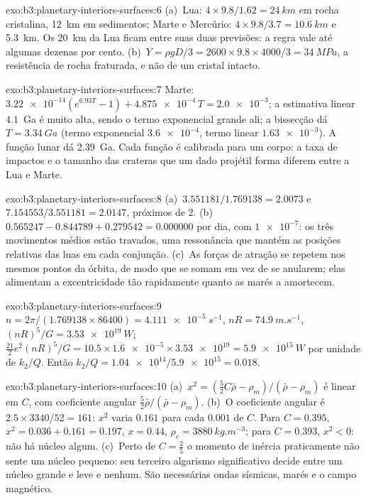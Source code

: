\begin{solution}{exo:b3:planetary-interiors-surfaces:6}
(a)~Lua: $4\times9.8/1.62 = \qty{24}{km}$ em rocha cristalina,
\qty{12}{km} em sedimentos; Marte e Mercúrio: $4\times9.8/3.7 =
\qty{10.6}{km}$ e \qty{5.3}{km}. Os \qty{20}{km} da Lua ficam entre
suas duas previsões: a regra vale até algumas dezenas por cento. (b)~$Y =
\rho gD/3 = 2600\times9.8\times4000/3 = \qty{34}{MPa}$, a resistência de
rocha fraturada, e não de um cristal intacto.
\end{solution}

\begin{solution}{exo:b3:planetary-interiors-surfaces:7}
Marte: $\num{3.22e-14}(e^{6.93T} - 1) + \num{4.875e-4}\,T = \num{2.0e-3}$;
a estimativa linear $4.1$~Ga é muito alta, sendo o termo exponencial grande
ali; a bissecção dá $T = \qty{3.34}{Ga}$ (termo exponencial
$\num{3.6e-4}$, termo linear $\num{1.63e-3}$). A função lunar dá
\qty{2.39}{Ga}. Cada função é calibrada para um corpo: a taxa de
impactos e o tamanho das crateras que um dado projétil forma diferem
entre a Lua e Marte.
\end{solution}

\begin{solution}{exo:b3:planetary-interiors-surfaces:8}
(a)~$3.551181/1.769138 = 2.0073$ e $7.154553/3.551181 = 2.0147$, próximos de
$2$. (b)~$0.565247 - 0.844789 + 0.279542 = 0.000000$ por dia, com
$\num{1e-7}$: os três movimentos médios estão travados, uma ressonância que mantém
as posições relativas das luas em cada conjunção. (c)~As forças de atração se repetem nos
mesmos pontos da órbita, de modo que se somam em vez de se anularem;
elas alimentam a excentricidade tão rapidamente quanto as marés a amortecem.
\end{solution}

\begin{solution}{exo:b3:planetary-interiors-surfaces:9}
$n = 2\pi/(1.769138\times86400) = \qty{4.111e-5}{s^{-1}}$, $nR =
\qty{74.9}{m.s^{-1}}$, $(nR)^5/G = \qty{3.53e19}{W}$;
$\tfrac{21}{2}e^2(nR)^5/G = 10.5\times\num{1.6e-5}\times\num{3.53e19} =
\qty{5.9e15}{W}$ por unidade de $k_2/Q$. Então $k_2/Q =
\num{1.04e14}/\num{5.9e15} = 0.018$.
\end{solution}

\begin{solution}{exo:b3:planetary-interiors-surfaces:10}
(a)~$x^2 = (\tfrac52C\bar\rho - \rho_m)/(\bar\rho - \rho_m)$ é linear em
$C$, com coeficiente angular $\tfrac52\bar\rho/(\bar\rho - \rho_m)$. (b)~O coeficiente angular é
$2.5\times3340/52 = 161$: $x^2$ varia $0.161$ para cada $0.001$ de $C$.
Para $C = 0.395$, $x^2 = 0.036 + 0.161 = 0.197$, $x = 0.44$, $\rho_c =
\qty{3880}{kg.m^{-3}}$; para $C = 0.393$, $x^2 < 0$: não há núcleo algum.
(c)~Perto de $C = \tfrac25$ o momento de inércia praticamente não sente um núcleo pequeno:
seu terceiro algarismo significativo decide entre um núcleo grande e leve e nenhum.
São necessárias ondas sísmicas, marés e o campo magnético.
\end{solution}

